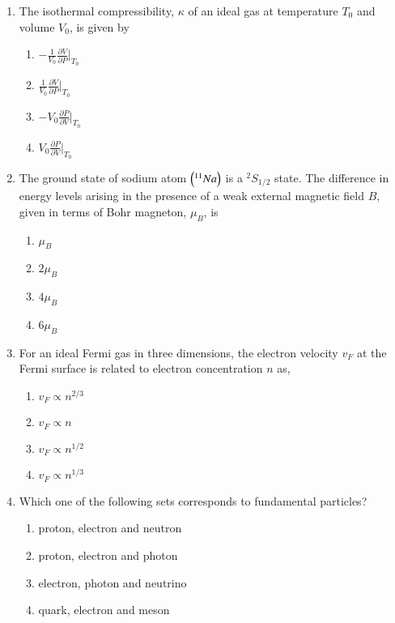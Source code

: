 \documentclass[journal]{IEEEtran}
\begin{document}
\begin{enumerate}
\item The isothermal compressibility, $\kappa$ of an ideal gas at temperature $T_0$ and volume $V_0$, is given by
\begin{multicols}{2}
    \begin{enumerate}
        \item $-\frac{1}{V_0} \frac{\partial V}{\partial P} \Big|_{T_0}$
        \item $\frac{1}{V_0} \frac{\partial V}{\partial P} \Big|_{T_0}$
        \item $-V_0 \frac{\partial P}{\partial V} \Big|_{T_0}$
        \item $V_0 \frac{\partial P}{\partial V} \Big|_{T_0}$
    \end{enumerate}
\end{multicols}

\item The ground state of sodium atom $\left(^{11}Na\right)$ is a $^{2} S_{1/2}$ state. The difference in energy levels arising in the presence of a weak external magnetic field $B$, given in terms of Bohr magneton, $\mu_B$, is
\begin{multicols}{2}
    \begin{enumerate}
        \item $\mu_B$ 
        \item $2 \mu_B$
        \item $4 \mu_B$
        \item $6 \mu_B$
    \end{enumerate}
\end{multicols}

\item For an ideal Fermi gas in three dimensions, the electron velocity $v_F$ at the Fermi surface is related
to electron concentration $n$ as, 
\begin{multicols}{2}
    \begin{enumerate}
        \item $v_F \propto n^{2/3}$
        \item $v_F \propto n$
        \item $v_F \propto n^{1/2}$
        \item $v_F \propto n^{1/3}$
    \end{enumerate}
\end{multicols}

\item Which one of the following sets corresponds to fundamental particles?
\begin{multicols}{2}
    \begin{enumerate}
        \item proton, electron and neutron
        \item proton, electron and photon
        \item electron, photon and neutrino
        \item quark, electron and meson
    \end{enumerate}
\end{multicols}


\end{enumerate}
\end{document}
